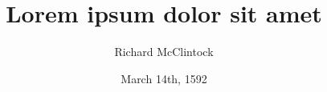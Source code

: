 


\title{Lorem ipsum dolor sit amet}
\author{Richard McClintock}
\date{March 14th, 1592}

\maketitle
